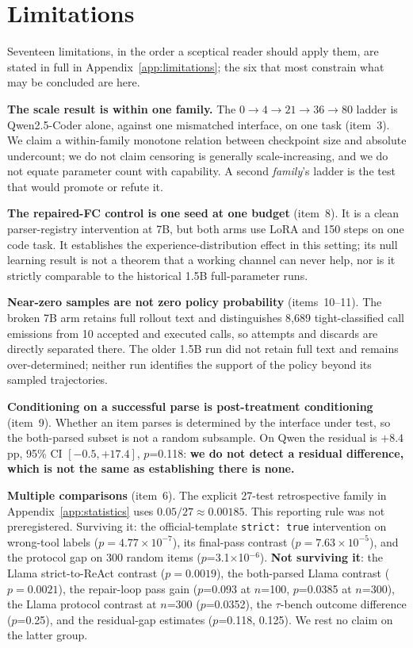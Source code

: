 \section{Limitations}
\label{sec:limitations}

Seventeen limitations, in the order a sceptical reader should apply them, are stated in full in
Appendix~\ref{app:limitations}; the six that most constrain what may be concluded are here.

\textbf{The scale result is within one family.} The $0\to4\to21\to36\to80$ ladder is
Qwen2.5-Coder alone, against one mismatched interface, on one task (item~3). We claim a
within-family monotone relation between checkpoint size and absolute undercount; we do not claim
censoring is generally scale-increasing, and we do not equate parameter count with capability. A
second \emph{family}'s ladder is the test that would promote or refute it.

\textbf{The repaired-FC control is one seed at one budget} (item~8). It is a clean parser-registry
intervention at 7B, but both arms use LoRA and 150 steps on one code task. It establishes the
experience-distribution effect in this setting; its null learning result is not a theorem that a
working channel can never help, nor is it strictly comparable to the historical 1.5B
full-parameter runs.

\textbf{Near-zero samples are not zero policy probability} (items~10--11). The broken 7B arm
retains full rollout text and distinguishes 8{,}689 tight-classified call emissions from 10 accepted and
executed calls, so attempts and discards are directly separated there. The older 1.5B run did not
retain full text and remains over-determined; neither run identifies the support of the policy
beyond its sampled trajectories.

\textbf{Conditioning on a successful parse is post-treatment conditioning} (item~9). Whether an
item parses is determined by the interface under test, so the both-parsed subset is not a random
subsample. On Qwen the residual is $+8.4$\,pp, 95\% CI $[-0.5,+17.4]$, $p$=0.118: \textbf{we do
not detect a residual difference, which is not the same as establishing there is none.}

\textbf{Multiple comparisons} (item~6). The explicit 27-test retrospective family in Appendix~\ref{app:statistics} uses
$0.05/27\approx0.00185$. This reporting rule was not preregistered. Surviving it: the official-template \texttt{strict: true} intervention on
wrong-tool labels ($p=4.77\times10^{-7}$), its final-pass contrast ($p=7.63\times10^{-5}$), and the
protocol gap on 300 random items ($p$=3.1$\times$10$^{-6}$). \textbf{Not surviving it}: the Llama strict-to-ReAct contrast ($p=0.0019$),
the both-parsed Llama contrast ($p=0.0021$), the
repair-loop pass gain ($p$=0.093 at $n$=100, $p$=0.0385 at $n$=300), the Llama protocol contrast
at $n$=300 ($p$=0.0352), the $\tau$-bench outcome difference ($p$=0.25), and the residual-gap
estimates ($p$=0.118, 0.125). We rest no claim on the latter group.

